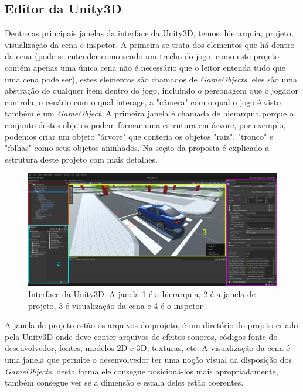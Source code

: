 \subsection{Editor da Unity3D}
Dentre as principais janelas da interface da Unity3D, temos: hierarquia, projeto, visualização da cena e inspetor. A primeira se trata dos elementos que há dentro da cena (pode-se entender como sendo um trecho do jogo, como este projeto contém apenas uma única cena não é necessário que o leitor entenda tudo que uma cena pode ser), estes elementos são chamados de \textit{GameObjects}, eles são uma abstração de qualquer item dentro do jogo, incluindo o personagem que o jogador controla, o cenário com o qual interage, a "câmera" com o qual o jogo é visto também é um \textit{GameObject}. A primeira janela é chamada de hierarquia porque o conjunto destes objetos podem formar uma estrutura em árvore, por exemplo, podemos criar um objeto "árvore" que conteria os objetos "raiz", "tronco" e "folhas" como seus objetos aninhados. Na seção da proposta é explicado a estrutura deste projeto com mais detalhes.

\begin{figure}[h]
   \centering
   \includegraphics[scale=0.2]{figs/interface-unity3d-indicadores.png}
    \caption{Interface da Unity3D. A janela 1 é a hierarquia, 2 é a janela de projeto, 3 é visualização da cena e 4 é o inspetor}
    \label{fig:prefixt}
 \end{figure}

A janela de projeto estão os arquivos do projeto, é um diretório do projeto criado pela Unity3D onde deve conter arquivos de efeitos sonoros, códigos-fonte do desenvolvedor, fontes, modelos 2D e 3D, texturas, etc. A visualização da cena é uma janela que permite o desenvolvedor ter uma noção visual da disposição dos \textit{GameObjects}, desta forma ele consegue posicioná-los mais apropriadamente, também consegue ver se a dimensão e escala deles estão coerentes. 

